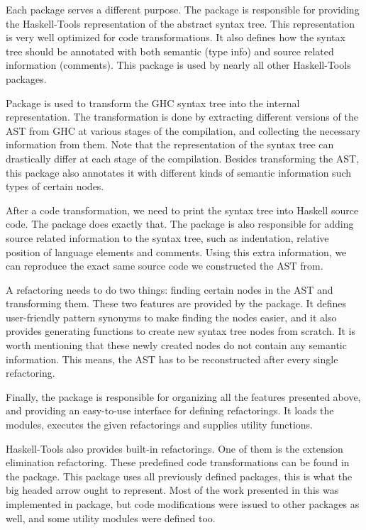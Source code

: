 \documentclass[main.tex]{subfiles}
\begin{document}
	Each package serves a different purpose. The  package is responsible for providing the Haskell-Tools representation of the abstract syntax tree. This representation is very well optimized for code transformations. It also defines how the syntax tree should be annotated with both semantic (type info) and source related information (comments). This package is used by nearly all other Haskell-Tools packages. 
	
	Package  is used to transform the GHC syntax tree into the internal representation. The transformation is done by extracting different versions of the AST from GHC at various stages of the compilation, and collecting the necessary information from them. Note that the representation of the syntax tree can drastically differ at each stage of the compilation. Besides transforming the AST, this package also annotates it with different kinds of semantic information such types of certain nodes.
	
	After a code transformation, we need to print the syntax tree into Haskell source code. The  package does exactly that. The package is also responsible for adding source related information to the syntax tree, such as indentation, relative position of language elements and comments. Using this extra information, we can reproduce the exact same source code we constructed the AST from.
	
	A refactoring needs to do two things: finding certain nodes in the AST and transforming them. These two features are provided by the  package. It defines user-friendly pattern synonyms to make finding the nodes easier, and it also provides generating functions to create new syntax tree nodes from scratch. It is worth mentioning that these newly created nodes do not contain any semantic information. This means, the AST has to be reconstructed after every single refactoring.
	
	Finally, the  package is responsible for organizing all the features presented above, and providing an easy-to-use interface for defining refactorings. It loads the modules, executes the given refactorings and supplies utility functions.
	
	Haskell-Tools also provides built-in refactorings. One of them is the extension elimination refactoring. These predefined code transformations can be found in the  package. This package uses all previously defined packages, this is what the big headed arrow ought to represent. Most of the work presented in this \paper{} was implemented in  package, but code modifications were issued to other packages as well, and some utility modules were defined too.
	
\end{document}
